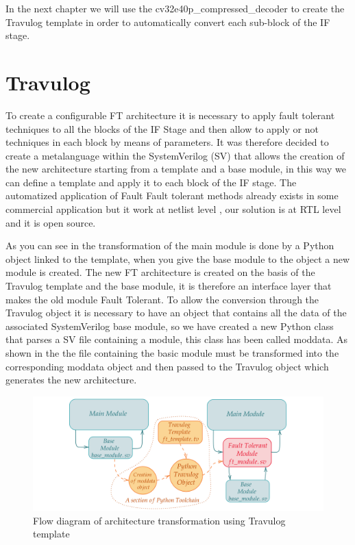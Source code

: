 {{{        	 In the next chapter we will use the cv32e40p\_compressed\_decoder to create the Travulog template in order to automatically convert each sub-block of the IF stage.
         }%
    }%
    
	\section{Travulog}{
	    \label{Travulog}
    	To create a configurable FT architecture it is necessary to apply fault tolerant techniques to all the blocks of the IF Stage and then allow to apply or not techniques in each block by means of parameters. It was therefore decided to create a metalanguage within the SystemVerilog (SV) that allows the creation of the new architecture starting from a template and a base module, in this way we can define a template and apply it to each block of the IF stage. The automatized application of Fault Fault tolerant methods already exists in some commercial application but it work at netlist level , our solution is at RTL level and it is open source. 
    	
    	As you can see in  the transformation of the main module is done by a Python object linked to the template, when you give the base module to the object a new module is created. The new FT architecture is created on the basis of the Travulog template and the base module, it is therefore an interface layer that makes the old module Fault Tolerant. 
    	To allow the conversion through the Travulog object it is necessary to have an object that contains all the data of the associated SystemVerilog base module, so we have created a new Python class that parses a SV file containing a module, this class has been called moddata. As shown in the  the file containing the basic module must be transformed into the corresponding moddata object and then passed to the Travulog object which generates the new architecture.
    	\begin{figure}[H]
    		\centering
    		\includegraphics[scale=0.2,center]{./images/Travulog_flow_blocks.png}
    		\caption{Flow diagram of architecture transformation using Travulog template}
    		\label{fig:TravulogFlowBlocks}
    	\end{figure} 
    	
}}
